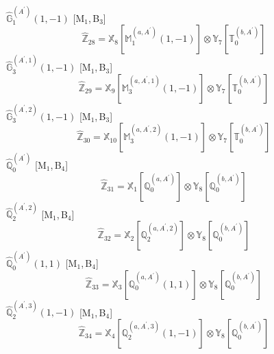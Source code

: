 \documentclass[fleqn,10pt,landscape]{article}
\begin{document}
\begin{itemize}
\vspace{4mm}
\noindent {} $\,\,\,\hat{\mathbb{G}}_{1}^{(A^{\prime})}(1,-1)$ [M$_{1}$,\,B$_{3}$]
\begin{dmath*}
\hat{\mathbb{Z}}_{28}=\mathbb{X}_{8}[\mathbb{M}_{1}^{(a,A^{\prime})}(1,-1)] \otimes\mathbb{Y}_{7}[\mathbb{T}_{0}^{(b,A^{\prime})}]
\end{dmath*}
\vspace{4mm}
\noindent {} $\,\,\,\hat{\mathbb{G}}_{3}^{(A^{\prime},1)}(1,-1)$ [M$_{1}$,\,B$_{3}$]
\begin{dmath*}
\hat{\mathbb{Z}}_{29}=\mathbb{X}_{9}[\mathbb{M}_{3}^{(a,A^{\prime},1)}(1,-1)] \otimes\mathbb{Y}_{7}[\mathbb{T}_{0}^{(b,A^{\prime})}]
\end{dmath*}
\vspace{4mm}
\noindent {} $\,\,\,\hat{\mathbb{G}}_{3}^{(A^{\prime},2)}(1,-1)$ [M$_{1}$,\,B$_{3}$]
\begin{dmath*}
\hat{\mathbb{Z}}_{30}=\mathbb{X}_{10}[\mathbb{M}_{3}^{(a,A^{\prime},2)}(1,-1)] \otimes\mathbb{Y}_{7}[\mathbb{T}_{0}^{(b,A^{\prime})}]
\end{dmath*}
\vspace{4mm}
\noindent {} $\,\,\,\hat{\mathbb{Q}}_{0}^{(A^{\prime})}$ [M$_{1}$,\,B$_{4}$]
\begin{dmath*}
\hat{\mathbb{Z}}_{31}=\mathbb{X}_{1}[\mathbb{Q}_{0}^{(a,A^{\prime})}] \otimes\mathbb{Y}_{8}[\mathbb{Q}_{0}^{(b,A^{\prime})}]
\end{dmath*}
\vspace{4mm}
\noindent {} $\,\,\,\hat{\mathbb{Q}}_{2}^{(A^{\prime},2)}$ [M$_{1}$,\,B$_{4}$]
\begin{dmath*}
\hat{\mathbb{Z}}_{32}=\mathbb{X}_{2}[\mathbb{Q}_{2}^{(a,A^{\prime},2)}] \otimes\mathbb{Y}_{8}[\mathbb{Q}_{0}^{(b,A^{\prime})}]
\end{dmath*}
\vspace{4mm}
\noindent {} $\,\,\,\hat{\mathbb{Q}}_{0}^{(A^{\prime})}(1,1)$ [M$_{1}$,\,B$_{4}$]
\begin{dmath*}
\hat{\mathbb{Z}}_{33}=\mathbb{X}_{3}[\mathbb{Q}_{0}^{(a,A^{\prime})}(1,1)] \otimes\mathbb{Y}_{8}[\mathbb{Q}_{0}^{(b,A^{\prime})}]
\end{dmath*}
\vspace{4mm}
\noindent {} $\,\,\,\hat{\mathbb{Q}}_{2}^{(A^{\prime},3)}(1,-1)$ [M$_{1}$,\,B$_{4}$]
\begin{dmath*}
\hat{\mathbb{Z}}_{34}=\mathbb{X}_{4}[\mathbb{Q}_{2}^{(a,A^{\prime},3)}(1,-1)] \otimes\mathbb{Y}_{8}[\mathbb{Q}_{0}^{(b,A^{\prime})}]

\end{dmath*}
\end{itemize}
\end{document}
